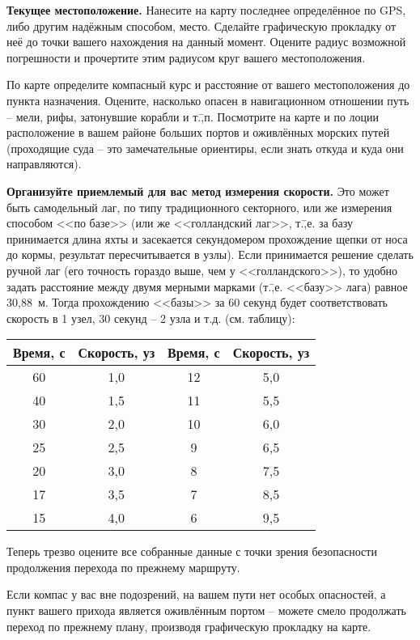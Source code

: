 \textbf{Текущее местоположение.} Нанесите на карту последнее определённое по GPS, либо другим надёжным способом, место. Сделайте графическую прокладку от неё до точки вашего нахождения на данный момент. Оцените радиус возможной погрешности и прочертите этим радиусом круг вашего местоположения. 

По карте определите компасный курс и расстояние от вашего местоположения до пункта назначения. Оцените, насколько опасен в навигационном отношении путь \--- мели, рифы, затонувшие корабли и т.\=,п. Посмотрите на карте и по лоции расположение в вашем районе больших портов и оживлённых морских путей (проходящие суда \--- это замечательные ориентиры, если знать откуда и куда они направляются). 

\textbf{Организуйте приемлемый для вас метод измерения скорости.} Это может быть самодельный лаг, по типу традиционного секторного, или же измерения способом <<по базе>> (или же <<голландский лаг>>, т.\=,е. за базу принимается длина яхты и засекается секундомером прохождение щепки от носа до кормы, результат пересчитывается в узлы). Если принимается решение сделать ручной лаг (его точность гораздо выше, чем у <<голландского>>), то удобно задать расстояние между двумя мерными марками (т.\=,е. <<базу>> лага) равное 30,88~м. Тогда прохождению <<базы>> за 60 секунд будет соответствовать скорость в 1 узел, 30 секунд \--- 2 узла и т.д. (см. таблицу):

\begin{longtable}{c|c||c|c}
  \toprule
  Время, с & Скорость, уз & Время, с & Скорость, уз \\
  \midrule
  60 & 1,0 & 12 & 5,0 \\
  40 & 1,5 & 11 & 5,5 \\
  30 & 2,0 & 10 & 6,0 \\
  25 & 2,5 & 9  & 6,5 \\
  20 & 3,0 & 8  & 7,5 \\
  17 & 3,5 & 7  & 8,5 \\
  15 & 4,0 & 6  & 9,5 \\
  \bottomrule
\end{longtable}

Теперь трезво оцените все собранные данные с точки зрения безопасности продолжения перехода по прежнему маршруту. 

Если компас у вас вне подозрений, на вашем пути нет особых опасностей, а пункт вашего прихода является оживлённым портом \--- можете смело продолжать переход по прежнему плану, производя графическую прокладку на карте. 

